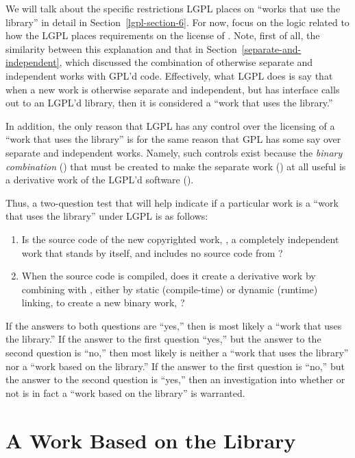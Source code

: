 \documentclass[11pt, letterpaper]{book}
\begin{document}
We will talk about the specific restrictions LGPL places on ``works
that use the library'' in detail in Section~\ref{lgpl-section-6}. For
now, focus on the logic related to how the LGPL places requirements on
the license of \lplusi{}. Note, first of all, the similarity between
this explanation and that in Section~\ref{separate-and-independent},
which discussed the combination of otherwise separate and independent
works with GPL'd code. Effectively, what LGPL does is say that when a
new work is otherwise separate and independent, but has interface
calls out to an LGPL'd library, then it is considered a ``work that
uses the library.''

In addition, the only reason that LGPL has any control over the licensing
of a ``work that uses the library'' is for the same reason that GPL has
some say over separate and independent works. Namely, such controls exist
because the {\em binary combination\/} (\lplusi{}) that must be created to
make the separate work (\worki{}) at all useful is a derivative work of
the LGPL'd software (\workl{}).

Thus, a two-question test that will help indicate if a particular work is
a ``work that uses the library'' under LGPL is as follows:

\begin{enumerate}

\item Is the source code of the new copyrighted work, \worki{}, a
  completely independent work that stands by itself, and includes no
  source code from \workl{}?

\item When the source code is compiled, does it create a derivative work
  by combining with \workl{}, either by static (compile-time) or dynamic
  (runtime) linking, to create a new binary work, \lplusi{}?
\end{enumerate}

If the answers to both questions are ``yes,'' then \worki{} is most likely
a ``work that uses the library.''  If the answer to the first question
``yes,'' but the answer to the second question is ``no,'' then most likely
\worki{} is neither a ``work that uses the library'' nor a ``work based on
the library.''  If the answer to the first question is ``no,'' but the
answer to the second question is ``yes,'' then an investigation into
whether or not \worki{} is in fact a ``work based on the library'' is
warranted.

\section{A Work Based on the Library}
\end{document}
